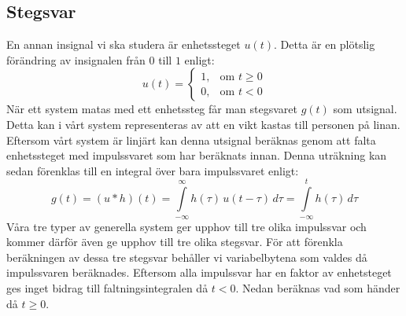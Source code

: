 \subsection{Stegsvar}
En annan insignal vi ska studera är enhetssteget $u(t)$. Detta är en plötslig förändring av insignalen från $0$ till $1$ enligt:
$$u(t)=\begin{cases} 1, & \text{om } t \ge 0 \\ 0, & \text{om } t < 0\end{cases}$$
När ett system matas med ett enhetssteg får man stegsvaret $g(t)$ som utsignal. Detta kan i vårt system representeras av att en vikt kastas till personen på linan. Eftersom vårt system är linjärt kan denna utsignal beräknas genom att falta enhetssteget med impulssvaret som har beräknats innan. Denna uträkning kan sedan förenklas till en integral över bara impulssvaret enligt:
$$g(t)=(u*h)(t)=\int\limits_{-\infty}^{\infty}h(\tau)\,u(t-\tau)\,d\tau=\int\limits_{-\infty}^{t}h(\tau)\,d\tau$$
Våra tre typer av generella system ger upphov till tre olika impulssvar och kommer därför även ge upphov till tre olika stegsvar. För att förenkla beräkningen av dessa tre stegsvar behåller vi variabelbytena som valdes då impulssvaren beräknades. Eftersom alla impulssvar har en faktor av enhetsteget ges inget bidrag till faltningsintegralen då $t < 0$. Nedan beräknas vad som händer då $t \ge 0$.
